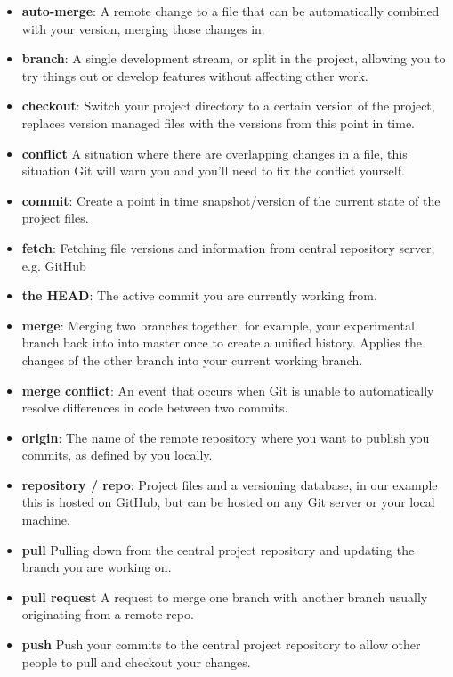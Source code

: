 \begin{itemize}[leftmargin=*]
	\item
	\textbf{auto-merge}:
		A remote change to a file that can be automatically combined with your version, merging those changes in.
	\item
		\textbf{branch}:
		A single development stream, or split in the project, allowing you to try things out or develop features without affecting other work.
	\item
		\textbf{checkout}:
		Switch your project directory to a certain version of the project, replaces version managed files with the versions from this point in time.
	\item
		\textbf{conflict}
		A situation where there are overlapping changes in a file, this situation Git will warn you and you’ll need to fix the conflict yourself.
	\item
		\textbf{commit}:
		Create a point in time snapshot/version of the current state of the project files.
	\item
        \textbf{fetch}:
		Fetching file versions and information from central repository server, e.g. GitHub
	\item
        \textbf{the HEAD}:
		The active commit you are currently working from.
	\item
		\textbf{merge}:
		Merging two branches together, for example, your experimental branch back into into master once to create a unified history. Applies the changes of the other branch into your current working branch.
    \item
		\textbf{merge conflict}:
		An event that occurs when Git is unable to automatically resolve differences in code between two commits.
	\item
		\textbf{origin}:
		The name of the remote repository where you want to publish you commits, as defined by you locally.
	\item
        \textbf{repository / repo}:
        Project files and a versioning database, in our example this is hosted on GitHub, but can be hosted on any Git server or your local machine.
    \item
    	\textbf{pull}
    	Pulling down from the central project repository and updating the branch you are working on.
   \item
    	\textbf{pull request}
    	A request to merge one branch with another branch usually originating from a remote repo.
    \item
    	\textbf{push}
    	Push your commits to the central project repository to allow other people to pull and checkout your changes.
\end{itemize}